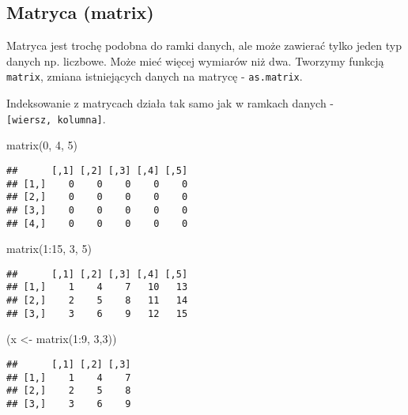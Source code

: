 \documentclass[
]{book}
\newenvironment{Shaded}{\begin{snugshade}}{\end{snugshade}}
\newcommand{\DecValTok}[1]{\textcolor[rgb]{0.00,0.00,0.81}{#1}}
\newcommand{\FunctionTok}[1]{\textcolor[rgb]{0.00,0.00,0.00}{#1}}
\newcommand{\NormalTok}[1]{#1}
\newcommand{\OtherTok}[1]{\textcolor[rgb]{0.56,0.35,0.01}{#1}}
\newcommand{\SpecialCharTok}[1]{\textcolor[rgb]{0.00,0.00,0.00}{#1}}
\begin{document}
\hypertarget{matryca-matrix}{%
\subsection{Matryca (matrix)}\label{matryca-matrix}}

Matryca jest trochę podobna do ramki danych, ale może zawierać tylko jeden typ danych np. liczbowe. Może mieć więcej wymiarów niż dwa. Tworzymy funkcją \texttt{matrix}, zmiana istniejących danych na matrycę - \texttt{as.matrix}.

Indeksowanie z matrycach działa tak samo jak w ramkach danych - \texttt{{[}wiersz,\ kolumna{]}}.

\begin{Shaded}
\begin{Highlighting}[]
\FunctionTok{matrix}\NormalTok{(}\DecValTok{0}\NormalTok{, }\DecValTok{4}\NormalTok{, }\DecValTok{5}\NormalTok{)}
\end{Highlighting}
\end{Shaded}

\begin{verbatim}
##      [,1] [,2] [,3] [,4] [,5]
## [1,]    0    0    0    0    0
## [2,]    0    0    0    0    0
## [3,]    0    0    0    0    0
## [4,]    0    0    0    0    0
\end{verbatim}

\begin{Shaded}
\begin{Highlighting}[]
\FunctionTok{matrix}\NormalTok{(}\DecValTok{1}\SpecialCharTok{:}\DecValTok{15}\NormalTok{, }\DecValTok{3}\NormalTok{, }\DecValTok{5}\NormalTok{)}
\end{Highlighting}
\end{Shaded}

\begin{verbatim}
##      [,1] [,2] [,3] [,4] [,5]
## [1,]    1    4    7   10   13
## [2,]    2    5    8   11   14
## [3,]    3    6    9   12   15
\end{verbatim}

\begin{Shaded}
\begin{Highlighting}[]
\NormalTok{(x }\OtherTok{\textless{}{-}} \FunctionTok{matrix}\NormalTok{(}\DecValTok{1}\SpecialCharTok{:}\DecValTok{9}\NormalTok{, }\DecValTok{3}\NormalTok{,}\DecValTok{3}\NormalTok{))}
\end{Highlighting}
\end{Shaded}

\begin{verbatim}
##      [,1] [,2] [,3]
## [1,]    1    4    7
## [2,]    2    5    8
## [3,]    3    6    9
\end{verbatim}
\end{document}
